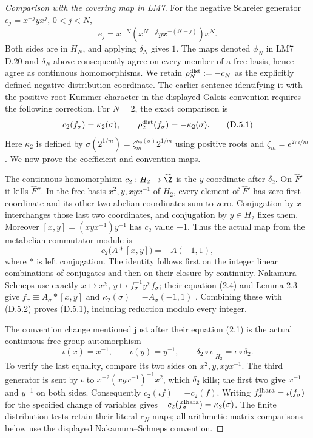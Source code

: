 \begin{proof}[Comparison with the covering map in LM7]
For the negative Schreier generator $e_j=x^{-j}yx^j$, $0<j<N$,
\[
 e_j=x^{-N}(x^{N-j}yx^{-(N-j)})x^N.
\]
Both sides are in $H_N$, and applying $\delta_N$ gives $1$.
The maps denoted $\phi_N$ in LM7 D.20 and $\delta_N$ above consequently
agree on every member of a free basis, hence agree as continuous
homomorphisms. We retain $\rho_N^{\rm dist}:=-c_N$ as
the explicitly defined negative distribution coordinate. The earlier
sentence identifying it with the positive-root Kummer character in
the displayed Galois convention requires the following correction.
For $N=2$, the exact comparison is
\[
 c_2(f_\sigma)=\kappa_2(\sigma),\qquad
 \rho_2^{\rm dist}(f_\sigma)=-\kappa_2(\sigma).
 \tag{D.5.1}
\]
Here $\kappa_2$ is defined by
$\sigma(2^{1/m})=\zeta_m^{\kappa_2(\sigma)}2^{1/m}$
using positive roots and $\zeta_m=e^{2\pi i/m}$.
We now prove the coefficient and convention maps.

The continuous homomorphism $c_2:H_2\to\widehat\Z$ is the
$y$ coordinate after $\delta_2$. On $\widehat F'$ it kills
$\widehat F''$. In the free basis
$x^2,y,xyx^{-1}$ of $H_2$, every element of $\widehat F'$
has zero first coordinate and its other two abelian coordinates
sum to zero. Conjugation by $x$ interchanges those last two
coordinates, and conjugation by $y\in H_2$ fixes them.
Moreover $[x,y]=(xyx^{-1})y^{-1}$ has $c_2$ value $-1$.
Thus the actual map from the metabelian commutator module is
\[
 c_2\bigl(A\ast[x,y]\bigr)=-A(-1,1),
 \tag{D.5.2}
\]
where $\ast$ is left conjugation. The identity follows first on
the integer linear combinations of conjugates and then on their
closure by continuity. Nakamura--Schneps use exactly
$x\mapsto x^\chi$, $y\mapsto f_\sigma^{-1}y^\chi f_\sigma$;
their equation (2.4) and Lemma 2.3 give
$f_\sigma\equiv A_\sigma\ast[x,y]$ and
$\kappa_2(\sigma)=-A_\sigma(-1,1)$
\cite[\S2, (2.1), (2.4), Lemma 2.3]{BCNakamuraSchneps2000}.
Combining these with \textup{(D.5.2)} proves
\textup{(D.5.1)}, including reduction modulo every integer.

The convention change mentioned just after their equation (2.1)
is the actual continuous free-group automorphism
\[
 \iota(x)=x^{-1},\qquad\iota(y)=y^{-1},\qquad
 \delta_2\circ\iota|_{H_2}=\iota\circ\delta_2.
 \tag{D.5.3}
\]
To verify the last equality, compare its two sides on
$x^2,y,xyx^{-1}$. The third generator is sent by $\iota$ to
$x^{-2}(xyx^{-1})^{-1}x^2$, which $\delta_2$ kills;
the first two give $x^{-1}$ and $y^{-1}$ on both sides.
Consequently $c_2(\iota f)=-c_2(f)$.
Writing $f_\sigma^{\rm Ihara}=\iota(f_\sigma)$ for the
specified change of variables gives
$-c_2(f_\sigma^{\rm Ihara})=\kappa_2(\sigma)$.
The finite distribution tests retain their literal $c_N$ maps;
all arithmetic matrix comparisons below use the displayed
Nakamura--Schneps convention.


\end{proof}

